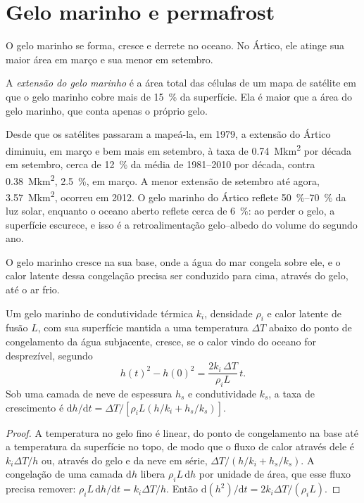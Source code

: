 \section{Gelo marinho e permafrost}\label{sec:b3:glaciology:sea-ice}

O gelo marinho se forma, cresce e derrete no oceano. No Ártico, ele atinge sua
maior área em março e sua menor em setembro.

\begin{definition}\label{def:b3:glaciology:sea-ice}
A \emph{extensão do gelo marinho} é a área total das
células de um mapa de satélite em que o gelo marinho cobre mais de
\qty{15}{\percent} da superfície. Ela é maior que a área do gelo marinho,
que conta apenas o próprio gelo.
\end{definition}

Desde que os satélites passaram a mapeá-la, em 1979, a extensão do Ártico diminuiu, em março e bem mais em setembro,
à taxa de \qty{0.74}{\mega km^2} por década em
setembro, cerca de \qty{12}{\percent} da média de 1981--2010 por década, contra
\qty{0.38}{\mega km^2}, \qty{2.5}{\percent}, em março. A menor
extensão de setembro até agora, \qty{3.57}{\mega km^2}, ocorreu em 2012. O gelo marinho do Ártico
reflete \qtyrange{50}{70}{\percent} da luz solar, enquanto o oceano aberto reflete
cerca de \qty{6}{\percent}: ao perder o gelo, a superfície escurece, e isso é a
retroalimentação gelo--albedo do volume do segundo ano.

O gelo marinho cresce na sua base, onde a água do mar congela sobre ele, e o calor latente
dessa congelação precisa ser conduzido para cima, através do gelo, até o ar frio.

\begin{theorem}\label{thm:b3:glaciology:stefan}
Um gelo marinho de condutividade térmica $k_i$, densidade $\rho_i$ e calor latente de
fusão $L$, com sua superfície mantida a uma temperatura $\Delta T$ abaixo do ponto de
congelamento da água subjacente, cresce, se o calor vindo do oceano for
desprezível, segundo
\[
h(t)^2 - h(0)^2 = \frac{2k_i\,\Delta T}{\rho_iL}\,t .
\]
Sob uma camada de neve de espessura $h_s$ e condutividade $k_s$, a taxa de
crescimento é $\mathrm dh/\mathrm dt = \Delta T/[\rho_iL(h/k_i + h_s/k_s)]$.
\end{theorem}

\begin{proof}
A temperatura no gelo fino é linear, do ponto de congelamento na
base até a temperatura da superfície no topo, de modo que o fluxo de calor através dele é
$k_i\Delta T/h$ ou, através do gelo e da neve em série, $\Delta T/(h/k_i +
h_s/k_s)$. A congelação de uma camada $\mathrm dh$ libera $\rho_iL\,\mathrm dh$ por
unidade de área, que esse fluxo precisa remover: $\rho_iL\,\mathrm dh/\mathrm dt
= k_i\Delta T/h$. Então $\mathrm d(h^2)/\mathrm dt = 2k_i\Delta T/(\rho_iL)$.
\end{proof}

